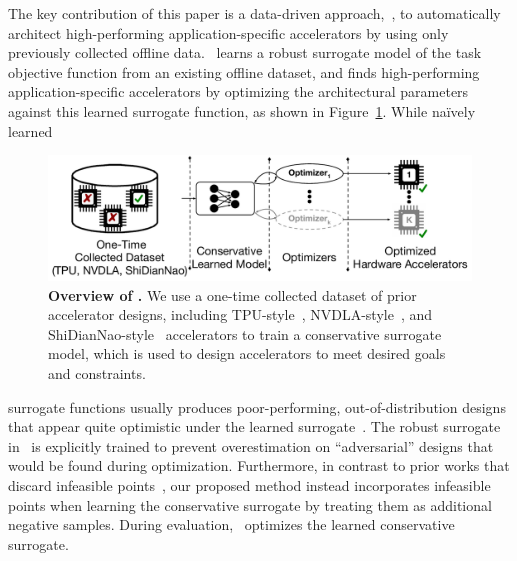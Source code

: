 The key contribution of this paper is a data-driven approach, \primemethodname\,, to automatically architect high-performing application-specific accelerators by using only previously collected offline data.
%
\primemethodname\ learns a robust surrogate model of the task objective function from an existing offline dataset, and finds high-performing application-specific accelerators by optimizing the architectural parameters against this learned surrogate function, as shown in Figure~\ref{fig:overview}. While na\"ively learned
%
\begin{figure}[t!]
    \centering
    \vspace{-0.1cm}
    \includegraphics[width=0.8\linewidth]{chapters/prime/figs/overview/prime-overview.pdf}
    \vspace{-0.2cm}
    \caption{\footnotesize{\textbf{Overview of \primemethodname.} We use a one-time collected dataset of prior accelerator designs, including TPU-style~\citep{yazdanbakhsh2021evaluation}, NVDLA-style~\citep{nvdla}, and ShiDianNao-style~\citep{shidiannao} accelerators to train a conservative surrogate model, which is used to design accelerators to meet desired goals and constraints.}}
    \vspace{-0.4cm}
    \label{fig:overview}
\end{figure}
surrogate functions usually produces poor-performing, out-of-distribution designs that appear quite optimistic under the learned surrogate~\citep{kumar2019model,brookes19a,trabucco2021conservative}.
%
The robust surrogate in \primemethodname\ is explicitly trained to prevent overestimation on ``adversarial'' designs that would be found during optimization.
%
Furthermore, in contrast to prior works that discard infeasible points~\citep{hegdemind,trabucco2021conservative}, our proposed method instead incorporates infeasible points when learning the conservative surrogate by treating them as additional negative samples.
%
During evaluation, \primemethodname\ optimizes the learned conservative surrogate.

